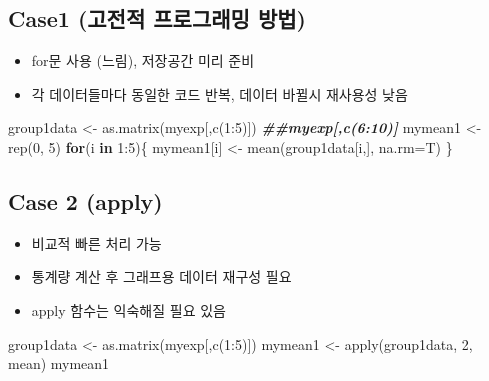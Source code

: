 \documentclass[
]{book}
\newenvironment{Shaded}{\begin{snugshade}}{\end{snugshade}}
\newcommand{\AttributeTok}[1]{\textcolor[rgb]{0.77,0.63,0.00}{#1}}
\newcommand{\ControlFlowTok}[1]{\textcolor[rgb]{0.13,0.29,0.53}{\textbf{#1}}}
\newcommand{\DecValTok}[1]{\textcolor[rgb]{0.00,0.00,0.81}{#1}}
\newcommand{\DocumentationTok}[1]{\textcolor[rgb]{0.56,0.35,0.01}{\textbf{\textit{#1}}}}
\newcommand{\FunctionTok}[1]{\textcolor[rgb]{0.00,0.00,0.00}{#1}}
\newcommand{\NormalTok}[1]{#1}
\newcommand{\OtherTok}[1]{\textcolor[rgb]{0.56,0.35,0.01}{#1}}
\newcommand{\SpecialCharTok}[1]{\textcolor[rgb]{0.00,0.00,0.00}{#1}}
\providecommand{\tightlist}{%
  \setlength{\itemsep}{0pt}\setlength{\parskip}{0pt}}
\begin{document}
\hypertarget{case1-uxace0uxc804uxc801-uxd504uxb85cuxadf8uxb798uxbc0d-uxbc29uxbc95}{%
\subsection{Case1 (고전적 프로그래밍 방법)}\label{case1-uxace0uxc804uxc801-uxd504uxb85cuxadf8uxb798uxbc0d-uxbc29uxbc95}}

\begin{itemize}
\tightlist
\item
  for문 사용 (느림), 저장공간 미리 준비
\item
  각 데이터들마다 동일한 코드 반복, 데이터 바뀔시 재사용성 낮음
\end{itemize}

\begin{Shaded}
\begin{Highlighting}[]
\NormalTok{group1data }\OtherTok{\textless{}{-}} \FunctionTok{as.matrix}\NormalTok{(myexp[,}\FunctionTok{c}\NormalTok{(}\DecValTok{1}\SpecialCharTok{:}\DecValTok{5}\NormalTok{)])}
\DocumentationTok{\#\#myexp[,c(6:10)]}
\NormalTok{mymean1 }\OtherTok{\textless{}{-}} \FunctionTok{rep}\NormalTok{(}\DecValTok{0}\NormalTok{, }\DecValTok{5}\NormalTok{)}
\ControlFlowTok{for}\NormalTok{(i }\ControlFlowTok{in} \DecValTok{1}\SpecialCharTok{:}\DecValTok{5}\NormalTok{)\{}
\NormalTok{  mymean1[i] }\OtherTok{\textless{}{-}} \FunctionTok{mean}\NormalTok{(group1data[i,], }\AttributeTok{na.rm=}\NormalTok{T)}
\NormalTok{\}}
\end{Highlighting}
\end{Shaded}

\hypertarget{case-2-apply}{%
\subsection{Case 2 (apply)}\label{case-2-apply}}

\begin{itemize}
\tightlist
\item
  비교적 빠른 처리 가능
\item
  통계량 계산 후 그래프용 데이터 재구성 필요
\item
  apply 함수는 익숙해질 필요 있음
\end{itemize}

\begin{Shaded}
\begin{Highlighting}[]
\NormalTok{group1data }\OtherTok{\textless{}{-}} \FunctionTok{as.matrix}\NormalTok{(myexp[,}\FunctionTok{c}\NormalTok{(}\DecValTok{1}\SpecialCharTok{:}\DecValTok{5}\NormalTok{)])}
\NormalTok{mymean1 }\OtherTok{\textless{}{-}} \FunctionTok{apply}\NormalTok{(group1data, }\DecValTok{2}\NormalTok{, mean)}
\NormalTok{mymean1}
\end{Highlighting}
\end{Shaded}
\end{document}
